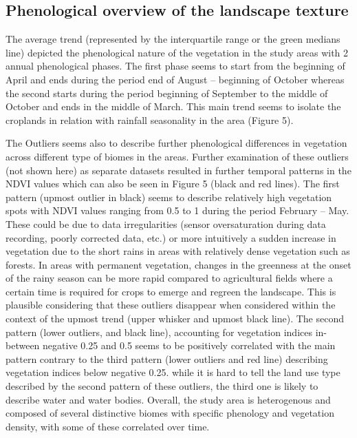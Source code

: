 \documentclass[12pt,oneside]{article}
\begin{document}
\hypertarget{II2}{%
\subsection{Phenological overview of the landscape texture}\label{II2}}

The average trend (represented by the interquartile range or the green medians line) depicted the phenological nature of the vegetation in the study areas with 2 annual phenological phases. The first phase seems to start from the beginning of April and ends during the period end of August -- beginning of October whereas the second starts during the period beginning of September to the middle of October and ends in the middle of March. This main trend seems to isolate the croplands in relation with rainfall seasonality in the area (Figure 5).

The Outliers seems also to describe further phenological differences in vegetation across different type of biomes in the areas. Further examination of these outliers (not shown here) as separate datasets resulted in further temporal patterns in the NDVI values which can also be seen in Figure 5 (black and red lines). The first pattern (upmost outlier in black) seems to describe relatively high vegetation spots with NDVI values ranging from 0.5 to 1 during the period February -- May. These could be due to data irregularities (sensor oversaturation during data recording, poorly corrected data, etc.) or more intuitively a sudden increase in vegetation due to the short rains in areas with relatively dense vegetation such as forests. In areas with permanent vegetation, changes in the greenness at the onset of the rainy season can be more rapid compared to agricultural fields where a certain time is required for crops to emerge and regreen the landscape. This is plausible considering that these outliers disappear when considered within the context of the upmost trend (upper whisker and upmost black line). The second pattern (lower outliers, and black line), accounting for vegetation indices in-between negative 0.25 and 0.5 seems to be positively correlated with the main pattern contrary to the third pattern (lower outliers and red line) describing vegetation indices below negative 0.25. while it is hard to tell the land use type described by the second pattern of these outliers, the third one is likely to describe water and water bodies. Overall, the study area is heterogenous and composed of several distinctive biomes with specific phenology and vegetation density, with some of these correlated over time.
\end{document}
